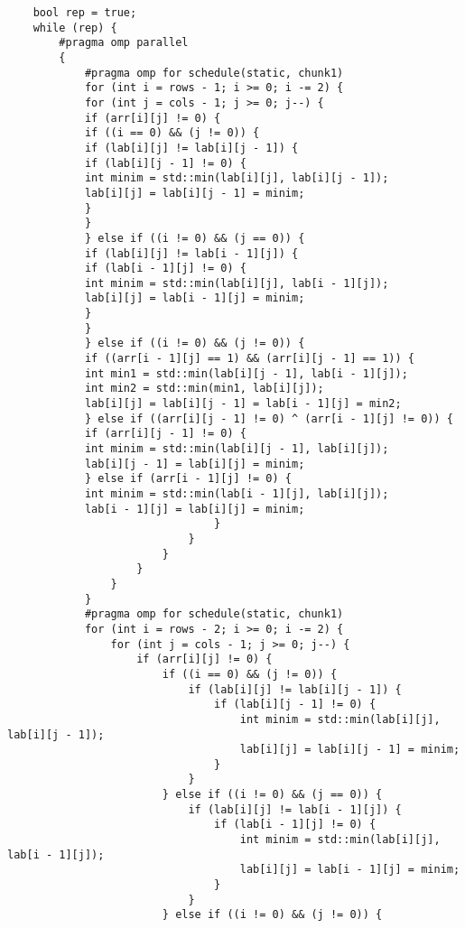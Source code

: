 \documentclass{report}
\begin{document}
\begin{lstlisting}
    bool rep = true;
    while (rep) {
        #pragma omp parallel
        {
            #pragma omp for schedule(static, chunk1)
            for (int i = rows - 1; i >= 0; i -= 2) {
            for (int j = cols - 1; j >= 0; j--) {
            if (arr[i][j] != 0) {
            if ((i == 0) && (j != 0)) {
            if (lab[i][j] != lab[i][j - 1]) {
            if (lab[i][j - 1] != 0) {
            int minim = std::min(lab[i][j], lab[i][j - 1]);
            lab[i][j] = lab[i][j - 1] = minim;
            }
            }
            } else if ((i != 0) && (j == 0)) {
            if (lab[i][j] != lab[i - 1][j]) {
            if (lab[i - 1][j] != 0) {
            int minim = std::min(lab[i][j], lab[i - 1][j]);
            lab[i][j] = lab[i - 1][j] = minim;
            }
            }
            } else if ((i != 0) && (j != 0)) {
            if ((arr[i - 1][j] == 1) && (arr[i][j - 1] == 1)) {
            int min1 = std::min(lab[i][j - 1], lab[i - 1][j]);
            int min2 = std::min(min1, lab[i][j]);
            lab[i][j] = lab[i][j - 1] = lab[i - 1][j] = min2;
            } else if ((arr[i][j - 1] != 0) ^ (arr[i - 1][j] != 0)) {
            if (arr[i][j - 1] != 0) {
            int minim = std::min(lab[i][j - 1], lab[i][j]);
            lab[i][j - 1] = lab[i][j] = minim;
            } else if (arr[i - 1][j] != 0) {
            int minim = std::min(lab[i - 1][j], lab[i][j]);
            lab[i - 1][j] = lab[i][j] = minim;
                                }
                            }
                        }
                    }
                }
            }
            #pragma omp for schedule(static, chunk1)
            for (int i = rows - 2; i >= 0; i -= 2) {
                for (int j = cols - 1; j >= 0; j--) {
                    if (arr[i][j] != 0) {
                        if ((i == 0) && (j != 0)) {
                            if (lab[i][j] != lab[i][j - 1]) {
                                if (lab[i][j - 1] != 0) {
                                    int minim = std::min(lab[i][j], lab[i][j - 1]);
                                    lab[i][j] = lab[i][j - 1] = minim;
                                }
                            }
                        } else if ((i != 0) && (j == 0)) {
                            if (lab[i][j] != lab[i - 1][j]) {
                                if (lab[i - 1][j] != 0) {
                                    int minim = std::min(lab[i][j], lab[i - 1][j]);
                                    lab[i][j] = lab[i - 1][j] = minim;
                                }
                            }
                        } else if ((i != 0) && (j != 0)) {

\end{lstlisting}
\end{document}

